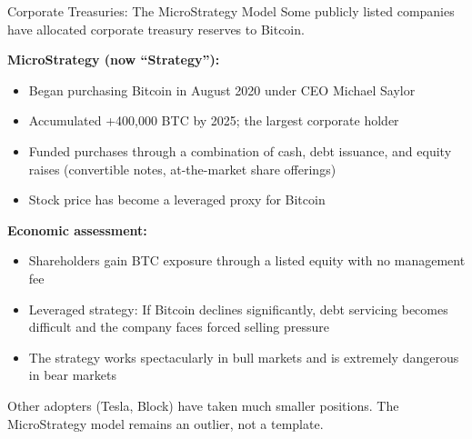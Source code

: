 \documentclass[10pt]{beamer}
\newcommand{\good}[1]{\textcolor{AccentGreen}{#1}}
\newcommand{\bad}[1]{\textcolor{AccentOrange}{#1}}
\begin{document}
\begin{frame}{Corporate Treasuries: The MicroStrategy Model}
  Some publicly listed companies have allocated corporate treasury reserves to Bitcoin.
  
  \vspace{0.5em}
  \textbf{MicroStrategy (now ``Strategy''):}
  \begin{itemize}
    \item Began purchasing Bitcoin in August 2020 under CEO Michael Saylor
    \item Accumulated +400,000 BTC by 2025; the largest corporate holder
    \item Funded purchases through a combination of cash, debt issuance, and equity raises (convertible notes, at-the-market share offerings)
    \item Stock price has become a leveraged proxy for Bitcoin
  \end{itemize}
  
  \vspace{0.5em}
  \textbf{Economic assessment:}
  \begin{itemize}
    \item \good{Shareholders gain BTC exposure through a listed equity with no management fee}
    \item \bad{Leveraged strategy}: If Bitcoin declines significantly, debt servicing becomes difficult and the company faces forced selling pressure
    \item The strategy works spectacularly in bull markets and is extremely dangerous in bear markets
  \end{itemize}
  
  \vspace{0.3em}
  Other adopters (Tesla, Block) have taken much smaller positions. The MicroStrategy model remains an outlier, not a template.
\end{frame}
\end{document}
